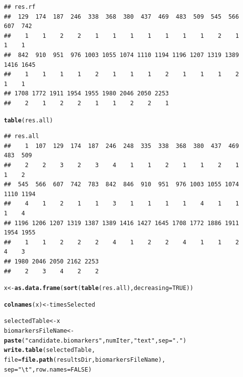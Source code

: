 \documentclass{article}\usepackage[]{graphicx}\usepackage[]{color}
\makeatletter
\newcommand{\hlnum}[1]{\textcolor[rgb]{0.686,0.059,0.569}{#1}}%
\newcommand{\hlstr}[1]{\textcolor[rgb]{0.192,0.494,0.8}{#1}}%
\newcommand{\hlstd}[1]{\textcolor[rgb]{0.345,0.345,0.345}{#1}}%
\newcommand{\hlkwb}[1]{\textcolor[rgb]{0.69,0.353,0.396}{#1}}%
\newcommand{\hlkwc}[1]{\textcolor[rgb]{0.333,0.667,0.333}{#1}}%
\newcommand{\hlkwd}[1]{\textcolor[rgb]{0.737,0.353,0.396}{\textbf{#1}}}%
\newenvironment{kframe}{%
 \def\at@end@of@kframe{}%
 \ifinner\ifhmode%
  \def\at@end@of@kframe{\end{minipage}}%
  \begin{minipage}{\columnwidth}%
 \fi\fi%
 \def\FrameCommand##1{\hskip\@totalleftmargin \hskip-\fboxsep
 \colorbox{shadecolor}{##1}\hskip-\fboxsep
     \hskip-\linewidth \hskip-\@totalleftmargin \hskip\columnwidth}%
 \MakeFramed {\advance\hsize-\width
   \@totalleftmargin\z@ \linewidth\hsize
   \@setminipage}}%
 {\par\unskip\endMakeFramed%
 \at@end@of@kframe}
\newenvironment{knitrout}{}{} %
\makeatother
\begin{document}
\begin{knitrout}
\begin{kframe}
\begin{alltt}
\end{alltt}
\begin{verbatim}
## res.rf
##  129  174  187  246  338  368  380  437  469  483  509  545  566  607  742 
##    1    1    2    2    1    1    1    1    1    1    1    2    1    1    1 
##  842  910  951  976 1003 1055 1074 1110 1194 1196 1207 1319 1389 1416 1645 
##    1    1    1    1    2    1    1    1    2    1    1    1    2    1    1 
## 1708 1772 1911 1954 1955 1980 2046 2050 2253 
##    2    1    2    2    1    1    2    2    1
\end{verbatim}
\begin{alltt}
\hlkwd{table}\hlstd{(res.all)}
\end{alltt}
\begin{verbatim}
## res.all
##    1  107  129  174  187  246  248  335  338  368  380  437  469  483  509 
##    2    2    3    2    3    4    1    1    2    1    1    2    1    1    2 
##  545  566  607  742  783  842  846  910  951  976 1003 1055 1074 1110 1194 
##    4    1    2    1    1    3    1    1    1    1    4    1    1    1    4 
## 1196 1206 1207 1319 1387 1389 1416 1427 1645 1708 1772 1886 1911 1954 1955 
##    1    1    2    2    2    4    1    2    2    4    1    1    2    4    3 
## 1980 2046 2050 2162 2253 
##    2    3    4    2    2
\end{verbatim}
\begin{alltt}
\hlstd{x}\hlkwb{<-}\hlkwd{as.data.frame}\hlstd{(}\hlkwd{sort}\hlstd{(}\hlkwd{table}\hlstd{(res.all),} \hlkwc{decreasing}\hlstd{=}\hlnum{TRUE}\hlstd{))}

\hlkwd{colnames}\hlstd{(x)} \hlkwb{<-} \hlstd{timesSelected}
\end{alltt}


{\ttfamily\noindent\bfseries\color{errorcolor}{\#\# Error in eval(expr, envir, enclos): object 'timesSelected' not found}}\begin{alltt}
\hlstd{selectedTable} \hlkwb{<-} \hlstd{x}
\hlstd{biomarkersFileName} \hlkwb{<-} \hlkwd{paste}\hlstd{(}\hlstr{"candidate.biomarkers"}\hlstd{, numIter,} \hlstr{"text"}\hlstd{,} \hlkwc{sep}\hlstd{=}\hlstr{"."}\hlstd{)}
\hlkwd{write.table}\hlstd{(selectedTable,}
            \hlkwc{file}\hlstd{=}\hlkwd{file.path}\hlstd{(resultsDir, biomarkersFileName),}
            \hlkwc{sep}\hlstd{=}\hlstr{"\textbackslash{}t"}\hlstd{,} \hlkwc{row.names}\hlstd{=}\hlnum{FALSE}\hlstd{)}
\end{alltt}
\end{kframe}
\end{knitrout}
\end{document}

